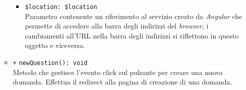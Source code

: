 \begin{itemize}
\begin{itemize}
\begin{itemize}
			\item \texttt{\$location: \$location} \\
			Parametro contenente un riferimento al servizio creato da \textit{Angular} che permette di accedere alla barra degli indirizzi del \textit{browser}, i cambiamenti all'URL nella barra degli indirizzi si riflettono in questo oggetto e viceversa.
		\end{itemize}
		\item \texttt{+} \texttt{newQuestion(): void} \\ 
		Metodo che gestisce l'evento click sul pulsante per creare una nuova domanda. Effettua il redirect alla pagina di creazione di una domanda.
	\end{itemize}
	
\end{itemize}

